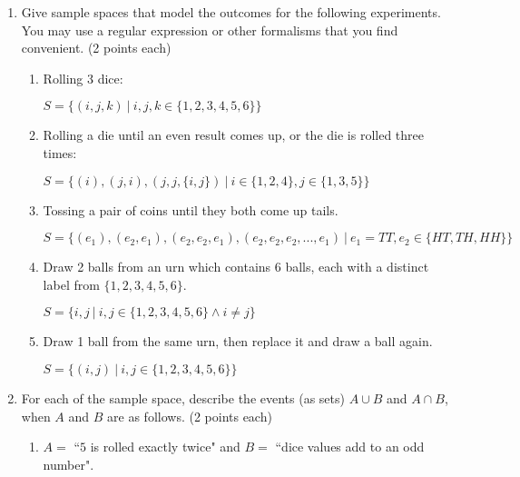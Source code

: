 \documentclass[11pt]{article}
\begin{document}
\begin{enumerate}
\begin{enumerate}
\begin{enumerate}
\end{enumerate}

\end{enumerate}

\item Give sample spaces that model the outcomes for the following experiments.
You may use a regular expression or other formalisms that you find convenient.
(2 points each)
\begin{enumerate}

\item Rolling 3 dice: 

$S = \{(i,j,k) \: | \: i,j,k \in \{1, 2, 3, 4, 5, 6 \}\} \!\,$

\item Rolling a die until an even result comes up, or the die is rolled three
times: 

$S = \{ ( i ) , ( j , i ), (  j , j , \{i,j\} ) \: | \: i \in \{1,2,4\}, j \in \{1,3,5\} \} $ %

\item Tossing a pair of coins until they both come up tails.  

$S = \{ (e_1), (e_2,e_1), (e_2,e_2,e_1), (e_2,e_2,e_2, ..., e_1) \: | \:e_1 = TT, e_2 \in \{HT, TH, HH\}\}$

\item Draw 2 balls from an urn which contains 6 balls, each with a
distinct label from $\{1,2,3,4,5,6\}$.

$S = \{i,j \: | \: i,j \in \{1,2,3,4,5,6\} \land i \neq j \}$

\item 
Draw 1 ball from the same urn, then replace it and draw a ball again.

$S = \{(i,j) \: | \: i,j \in \{1,2,3,4,5,6\}\}$

\end{enumerate}


\item For each of the sample space, describe the events (as sets)
$A\cup B$ and $A \cap B$, when $A$ and $B$ are as follows.  (2 points each)
\begin{enumerate}

\item $A =$ ``$5$ is rolled exactly twice" and $B = $ ``dice values add to an
odd number".


\begin {enumerate}


\end{enumerate}
\end{enumerate}
\end{enumerate}
\end{document}
